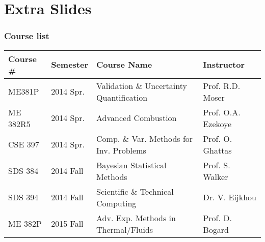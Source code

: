\documentclass[mathserif]{beamer}
\begin{document}
%
\appendix
\section{Extra Slides}

\begin{frame}
 \frametitle{Course list}
 \footnotesize
 \begin{table}[h]
  \centering
  \begin{tabular}{llll}
   \hline \hline
   Course \# & Semester & Course Name & Instructor \\ 
   \hline 
   ME381P   & 2014 Spr.   & Validation \& Uncertainty Quantification &
	       Prof. R.D. Moser \\
   ME 382R5 & 2014 Spr.   & Advanced Combustion & Prof. O.A. Ezekoye \\
   CSE 397  & 2014 Spr.   &  Comp. \& Var. Methods for
	   Inv. Problems & Prof. O. Ghattas \\
   SDS 384  & 2014 Fall   & Bayesian Statistical Methods & Prof. S.
	       Walker \\
   SDS 394  & 2014 Fall   & Scientific \& Technical Computing & Dr. V. Eijkhou \\
   ME 382P  & 2015 Fall   & Adv. Exp. Methods in Thermal/Fluids
	   & Prof. D. Bogard \\  
   \hline \hline
  \end{tabular} 
 \end{table}

\end{frame}
\end{document}
